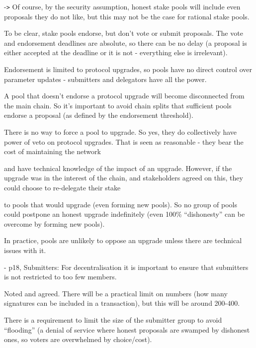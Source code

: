 \documentclass{article}
\begin{document}
\parindent=18pt
-\texttt{>}  Of course, by the security assumption, honest stake pools will include 
even proposals they do not like, but this may not be the case for rational stake 
pools.

\vspace{12pt}
\parindent=0pt
{\color{color02} To be clear, stake pools endorse, but don't vote or submit proposals. 
 The vote and endorsement deadlines are absolute, so there can be no delay (a proposal 
is either accepted at the deadline or it is not - everything else is irrelevant).}

{\color{color02} Endorsement is limited to protocol upgrades, so pools have no 
direct control over parameter updates - submitters and delegators have all the 
power.  }

\vspace{12pt}
{\color{color02} A pool that doesn't endorse a protocol upgrade will become disconnected 
from the main chain.  So it's important to avoid chain splits that sufficient pools 
endorse a proposal (as defined by the endorsement threshold).  }

{\color{color02} There is no way to force a pool to upgrade.  So yes, they do collectively 
have power of veto on protocol upgrades.  That is seen as reasonable - they bear 
the cost of maintaining the network}

{\color{color02} and have technical knowledge of the impact of an upgrade.  However, 
if the upgrade was in the interest of the chain, and stakeholders agreed on this, 
they could choose to re-delegate their stake}

{\color{color02} to pools that would upgrade (even forming new pools).  So no group 
of pools could postpone an honest upgrade indefinitely (even 100\% ``dishonesty'' 
can be overcome by forming new pools).}

\vspace{12pt}
{\color{color02} In practice, pools are unlikely to oppose an upgrade unless there 
are technical issues with it.}

\vspace{12pt}
- p18, Submitters: For decentralisation it is important to ensure that submitters 
is not restricted to too few members.

\vspace{12pt}
{\color{color02} Noted and agreed.  There will be a practical limit on numbers 
(how many signatures can be included in a transaction), but this will be around 
200-400.}

{\color{color02} There is a requirement to limit the size of the submitter group 
to avoid ``flooding'' (a denial of service where honest proposals are swamped by 
dishonest ones, so voters are overwhelmed by choice/cost).}
\end{document}
